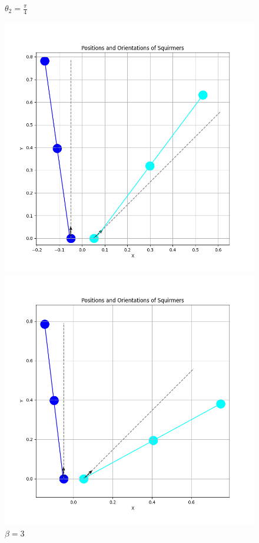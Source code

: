 \documentclass{article}
\begin{document}
\begin{figure}[H]
    \centering
    \textbf{$\theta_2 = \frac{\pi}{4}$}\par\medskip
    \begin{minipage}{0.49\textwidth}
        \includegraphics[width=1.1\textwidth]{graphs/simulations/sim_sq_sq/betam3/pi_4_.png}
        \caption{\footnotesize $\beta = -3$}
    \end{minipage}\hfill
    \begin{minipage}{0.49\textwidth}
        \includegraphics[width=1.1\textwidth]{graphs/simulations/sim_sq_sq/beta3/pi_4_.png}
        \caption{\footnotesize $\beta = 3$}
    \end{minipage}
\end{figure}
\end{document}
